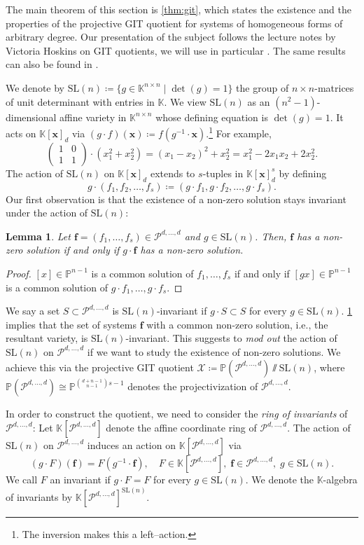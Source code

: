 \documentclass[11pt,a4paper]{article}
\newtheorem{lemma}[theorem]{Lemma}\AddToHook{env/lemma/begin}{\crefalias{theorem}{lemma}}
\numberwithin{equation}{section}
\newcommand{\PP}{\mathbb{P}}
\newcommand{\KK}{\mathbb{K}}
\newcommand{\cX}{\mathcal{X}}
\newcommand{\cP}{\mathcal{P}}
\newcommand{\xx}{\ensuremath{\boldsymbol{x}}}
\newcommand{\ff}{\ensuremath{\boldsymbol{f}}}
\newcommand{\SL}{\mathrm{SL}}
\begin{document}
The main theorem of this section is \cref{thm:git}, which states the existence and the properties of the projective GIT quotient for systems of homogeneous forms of arbitrary degree.
Our presentation of the subject follows the lecture notes by Victoria Hoskins on GIT quotients, we will use in particular \cite[Theorem~4.11]{Hoskins-12}.
The same results can also be found in \cite{MFK-94}.

We denote by $\SL(n)\coloneqq\{g\in\KK^{n\times n}\mid \det (g)=1\}$ the group of $n\times n$-matrices of unit determinant with entries in $\KK$. 
We view $\SL(n)$ as an $(n^2-1)$-dimensional affine variety in $\KK^{n\times n}$ whose defining equation is $\det(g)=1$.
It acts on $\KK[\xx]_d$ via $
(g\cdot f)(\xx)\coloneqq f(g^{-1}\cdot \xx)$.\footnote{The inversion makes this a left--action.} For example, \[
\begin{pmatrix}
    1 & 0\\
    1 & 1
\end{pmatrix} \cdot (x_1^2 + x_2^2) = (x_1-x_2)^2 + x_2^2 = x_1^2 -2 x_1 x_2 + 2 x_2^2.
\] The action of $\SL(n)$ on $\KK[\xx]_d$ extends to $s$-tuples in $\KK[\xx]_d^{s}$ by defining \[
g\cdot (f_1,f_2,\dots,f_s) \coloneqq (g\cdot f_1, g\cdot f_2,\dots, g\cdot f_s).
\]
Our first observation is that the existence of a non-zero solution stays invariant under the action of $\SL(n)$:
\begin{lemma}
\label{lem:orbit-solution}
    Let $\ff=(f_1,\dots,f_s)\in\cP^{d,\dots,d}$ and $g\in\SL(n)$.
    Then, $\ff$ has a non-zero solution if and only if $g\cdot \ff$ has a non-zero solution.
\end{lemma}
\begin{proof}
    $[x]\in\PP^{n-1}$ is a common solution of $f_1,\dots,f_s$ if and only if $[g x]\in\PP^{n-1}$ is a common solution of $g\cdot f_1,\dots,g\cdot f_s$.
\end{proof}
We say a set $S\subset\cP^{d,\dots,d}$ is $\SL(n)$-invariant if $g\cdot S\subset S$ for every $g\in\SL(n)$.
\cref{lem:orbit-solution} implies that the set of systems $\ff$ with a common non-zero solution, i.e., the resultant variety, is $\SL(n)$-invariant.
This suggests to \emph{mod out} the action of $\SL(n)$ on $\cP^{d,\dots,d}$ if we want to study the existence of non-zero solutions.
We achieve this via the projective GIT quotient $
\cX\coloneqq \PP(\cP^{d,\dots,d})\sslash\SL(n)
$, where $\PP(\cP^{d,\dots,d})\cong\PP^{\binom{d+n-1}{n-1}s-1}$ denotes the projectivization of $\cP^{d,\dots,d}$.

In order to construct the quotient, we need to consider the \emph{ring of invariants} of $\cP^{d,\dots,d}$:
Let $\KK[\cP^{d,\dots,d}]$ denote the affine coordinate ring of $\cP^{d,\dots,d}$.
The action of $\SL(n)$ on $\cP^{d,\dots,d}$ induces an action on $\KK[\cP^{d,\dots,d}]$ via \[
(g\cdot F)(\ff) = F(g^{-1}\cdot \ff), \quad F\in \KK[\cP^{d,\dots,d}], \; \ff\in\cP^{d,\dots,d}, \; g\in \SL(n).
\] We call $F$ an invariant if $g\cdot F=F$ for every $g\in\SL(n)$.
We denote the $\KK$-algebra of invariants by $\KK[\cP^{d,\dots,d}]^{\SL(n)}$.
\end{document}
